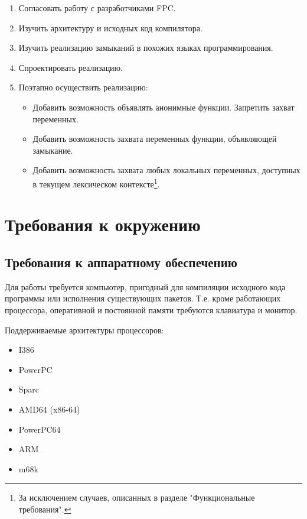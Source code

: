 \documentclass{imcs}
\begin{document}
\begin{enumerate}
    \item Согласовать работу с разработчиками FPC.
    \item Изучить архитектуру и исходных код компилятора.
    \item Изучить реализацию замыканий в похожих языках программирования.
    \item Спроектировать реализацию.
    \item Поэтапно осуществить реализацию:
      \begin{itemize}
          \item Добавить возможность объявлять анонимные функции. Запретить захват переменных.
          \item Добавить возможность захвата переменных функции, объявляющей замыкание.
          \item Добавить возможность захвата любых локальных переменных, 
                доступных в текущем лексическом контексте\footnote{За исключением случаев, описанных в разделе "Функциональные требования".}.
      \end{itemize}        
\end{enumerate}

\section{Требования к окружению}

\subsection{Требования к аппаратному обеспечению}

Для работы требуется компьютер, пригодный для компиляции исходного кода программы или исполнения существующих пакетов.
Т.е. кроме работающих процессора, оперативной и постоянной памяти требуются
клавиатура и монитор.

Поддерживаемые архитектуры процессоров\cite{fpctargets}:
\begin{itemize}
    \item I386
    \item PowerPC
    \item Sparc
    \item AMD64 (x86-64)
    \item PowerPC64
    \item ARM
    \item m68k 
\end{itemize}
\end{document}
